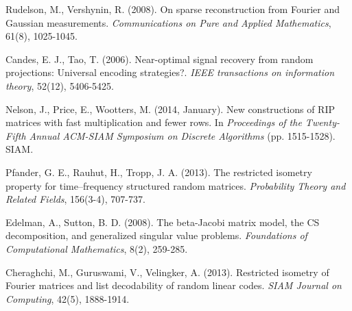 \documentclass[a4paper,12pt]{article}
\begin{document}
\begin{thebibliography}{1}
 Rudelson, M., Vershynin, R. (2008). On sparse reconstruction from Fourier and Gaussian measurements. \emph{Communications on Pure and Applied Mathematics}, 61(8), 1025-1045.


 Candes, E. J., Tao, T. (2006). Near-optimal signal recovery from random projections: Universal encoding strategies?. \emph{IEEE transactions on information theory}, 52(12), 5406-5425.


 Nelson, J., Price, E., Wootters, M. (2014, January). New constructions of RIP matrices with fast multiplication and fewer rows. In \emph{Proceedings of the Twenty-Fifth Annual ACM-SIAM Symposium on Discrete Algorithms} (pp. 1515-1528). SIAM.



 Pfander, G. E., Rauhut, H., Tropp, J. A. (2013). The restricted isometry property for time--frequency structured random matrices. \emph{Probability Theory and Related Fields}, 156(3-4), 707-737.


 Edelman, A., Sutton, B. D. (2008). The beta-Jacobi matrix model, the CS decomposition, and generalized singular value problems. \emph{Foundations of Computational Mathematics}, 8(2), 259-285.


 Cheraghchi, M., Guruswami, V., Velingker, A. (2013). Restricted isometry of Fourier matrices and list decodability of random linear codes. \emph{SIAM Journal on Computing}, 42(5), 1888-1914.



\end{thebibliography}
\end{document}
